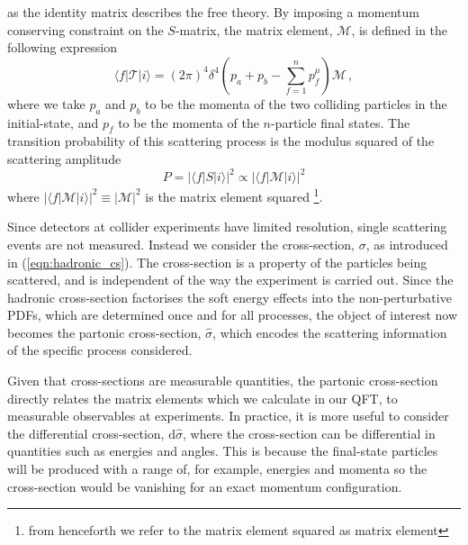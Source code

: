 \documentclass[main.tex]{subfiles}
\begin{document}
    as the identity matrix describes the free theory.
    By imposing a momentum conserving constraint
    on the $S$-matrix, the matrix element,
    $\mathcal{M}$, is defined in the following expression
    \begin{equation}\label{eqn:S_matrix_element}
        \langle f | \mathcal{T} | i \rangle = (2\pi)^{4} \delta^{4}\left(p_{a} + p_{b} - \sum_{f=1}^{n} p_{f}^{\mu}\right) \mathcal{M} \, ,
    \end{equation}
    where we take $p_{a}$ and $p_{b}$ to be
    the momenta of the two colliding
    particles in the initial-state, and $p_{f}$ to be the
    momenta of the $n$-particle final states.
    The transition probability of this scattering process
    is the modulus squared of the scattering amplitude
    \begin{equation}\label{eqn:S_prob}
        P = |\langle f | S | i \rangle|^{2} \propto | \langle f | \mathcal{M} | i \rangle |^{2}
    \end{equation}
    where $|\langle f | \mathcal{M} | i \rangle|^{2}  \equiv |\mathcal{M}|^{2}$
    is the matrix element squared \footnote{from henceforth we refer to the matrix
    element squared as matrix element}.
    
    Since detectors at collider experiments
    have limited resolution, single scattering
    events are not measured. Instead we consider
    the cross-section, $\sigma$, as introduced in
    (\ref{eqn:hadronic_cs}). The cross-section is a property
    of the particles being scattered, and is independent
    of the way the experiment is carried out.
    Since the hadronic cross-section factorises
    the soft energy effects into the non-perturbative PDFs,
    which are determined once and for all
    processes, the object of interest now becomes the
    partonic cross-section, $\hat{\sigma}$, which
    encodes the scattering information of the specific
    process considered.

    Given that cross-sections are measurable
    quantities, the partonic cross-section directly
    relates the matrix elements which we calculate in our QFT,
    to measurable observables at experiments.
    In practice, it is more useful to consider the
    differential cross-section, $\mathrm{d}\hat{\sigma}$,
    where the cross-section can be differential
    in quantities such as energies and angles.
    This is because the final-state particles
    will be produced with a range of, for example,
    energies and momenta so the cross-section would
    be vanishing for an exact momentum configuration.
\end{document}
